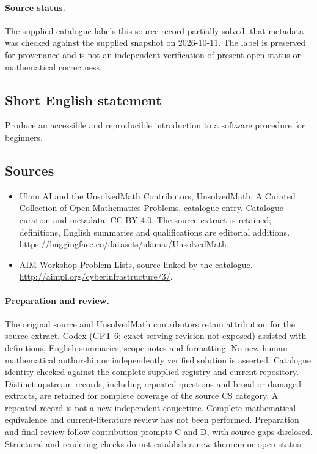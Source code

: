\documentclass[11pt]{article}
\begin{document}
\paragraph{Source status.}
The supplied catalogue labels this source record partially solved; that metadata was checked against the supplied snapshot on 2026-10-11. The label is preserved for provenance and is not an independent verification of present open status or mathematical correctness.
\subsection{Short English statement}
Produce an accessible and reproducible introduction to a software procedure for beginners.
\subsection{Sources}
\begin{itemize}
\item[\hypertarget{source:statement:1}{S1}] Ulam AI and the UnsolvedMath Contributors, UnsolvedMath: A Curated Collection of Open Mathematics Problems, catalogue entry. Catalogue curation and metadata: CC BY 4.0. The source extract is retained; definitions, English summaries and qualifications are editorial additions.
\url{https://huggingface.co/datasets/ulamai/UnsolvedMath}.
\item[\hypertarget{source:statement:2}{S2}] AIM Workshop Problem Lists, source linked by the catalogue.
\url{http://aimpl.org/cyberinfrastructure/3/}.
\end{itemize}
\paragraph{Preparation and review.}
The original source and UnsolvedMath contributors retain attribution for the source extract. Codex (GPT-6; exact serving revision not exposed) assisted with definitions, English summaries, scope notes and formatting. No new human mathematical authorship or independently verified solution is asserted. Catalogue identity checked against the complete supplied registry and current repository. Distinct upstream records, including repeated questions and broad or damaged extracts, are retained for complete coverage of the source CS category. A repeated record is not a new independent conjecture. Complete mathematical-equivalence and current-literature review has not been performed. Preparation and final review follow contribution prompts C and D, with source gaps disclosed. Structural and rendering checks do not establish a new theorem or open status.
\label{end:statement}
\end{document}
